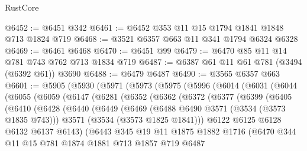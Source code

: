 \begin{lexlean}{RustCore}
\begin{coremodule}
@6452 := @6451 @342
@6461 := @6452 @353 @11 @15 @1794 @1841 @1848 @713 @1824 @719
@6468 := @3521 @6357 @663 @11 @341 @1794 @6324 @6328
@6469 := @6461 @6468
@6470 := @6451 @99
@6479 := @6470 @85 @11 @14 @781 @743 @762 @713 @1834 @719
@6487 := @6387 @61 @11 @61 @781 (@3494 (@6392 @61)) @3690
@6488 := @6479 @6487
@6490 := @3565 @6357 @663
@6601 := @5905
    (@5930
      (@5971
        (@5973
          (@5975
            (@5996
              (@6014
                (@6031
                  (@6044
                    (@6055
                      (@6059
                        (@6147
                          (@6281
                            (@6352
                              (@6362
                                (@6372
                                  (@6377
                                    (@6399
                                      (@6405
                                        (@6410
                                          (@6428
                                            (@6440
                                              (@6449
                                                (@6469
                                                  (@6488 @6490 @3571 (@3534 (@3573 @1835 @743)))
                                                  @3571
                                                  (@3534 (@3573 @1825 @1841)))
                                                @6122
                                                @6125
                                                @6128
                                                @6132
                                                @6137
                                                @6143)
                                              (@6443
                                                @345
                                                @19
                                                @11
                                                @1875
                                                @1882
                                                @1716
                                                (@6470
                                                  @344
                                                  @11
                                                  @15
                                                  @781
                                                  @1874
                                                  @1881
                                                  @713
                                                  @1857
                                                  @719
                                                  @6487

\end{coremodule}
\end{lexlean}
